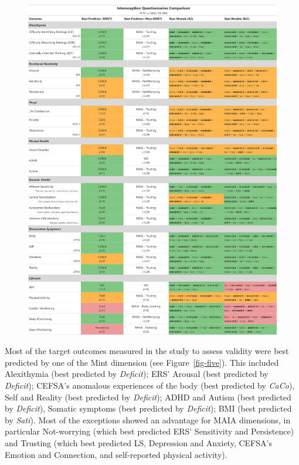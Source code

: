 \documentclass[
  jou,
  floatsintext,
  longtable,
  nolmodern,
  notxfonts,
  notimes,
  colorlinks=true,linkcolor=blue,citecolor=blue,urlcolor=blue]{apa7}
\begin{document}
\begin{figure}[!htbp]
\begin{center}
\includegraphics[width=0.82\linewidth,height=\textheight,keepaspectratio]{../study2/analysis/figures/table2.png}
\end{center}

\end{figure}

Most of the target outcomes measured in the study to assess validity
were best predicted by one of the Mint dimension (see
Figure~\ref{fig-five}). This included Alexithymia (best predicted by
\emph{Deficit}); ERS' Arousal (best predicted by \emph{Deficit});
CEFSA's anomalous experiences of the body (best predicted by
\emph{CaCo}), Self and Reality (best predicted by \emph{Deficit}); ADHD
and Autism (best predicted by \emph{Deficit}), Somatic symptoms (best
predicted by \emph{Deficit}); BMI (best predicted by \emph{Sati}). Most
of the exceptions showed an advantage for MAIA dimensions, in particular
Not-worrying (which best predicted ERS' Sensitivity and Persistence) and
Trusting (which best predicted LS, Depression and Anxiety, CEFSA's
Emotion and Connection, and self-reported physical activity).
\end{document}
